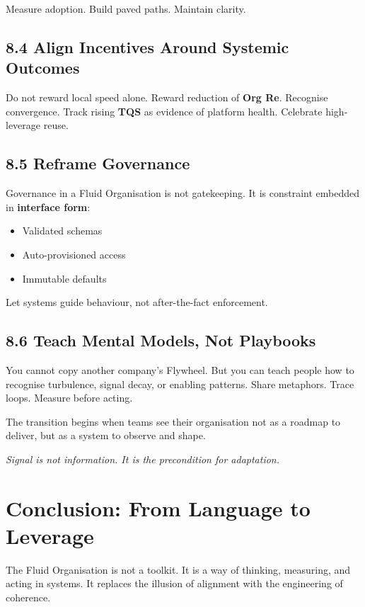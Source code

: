 \documentclass[12pt]{article}
\newenvironment{pullquote}
  {\begin{quoting}[leftmargin=2em,rightmargin=2em]\itshape}
  {\end{quoting}}
\begin{document}
Measure adoption. Build paved paths. Maintain clarity.

\subsection*{8.4 Align Incentives Around Systemic Outcomes}

Do not reward local speed alone. Reward reduction of \textbf{Org Re}. Recognise convergence. Track rising \textbf{TQS} as evidence of platform health. Celebrate high-leverage reuse.

\subsection*{8.5 Reframe Governance}

Governance in a Fluid Organisation is not gatekeeping. It is constraint embedded in \textbf{interface form}:
\begin{itemize}
    \item Validated schemas
    \item Auto-provisioned access
    \item Immutable defaults
\end{itemize}

Let systems guide behaviour, not after-the-fact enforcement.

\subsection*{8.6 Teach Mental Models, Not Playbooks}

You cannot copy another company’s Flywheel. But you can teach people how to recognise turbulence, signal decay, or enabling patterns. Share metaphors. Trace loops. Measure before acting.

The transition begins when teams see their organisation not as a roadmap to deliver, but as a system to observe and shape.

\begin{pullquote}
Signal is not information. It is the precondition for adaptation.
\end{pullquote}

\section{Conclusion: From Language to Leverage}

The Fluid Organisation is not a toolkit. It is a way of thinking, measuring, and acting in systems. It replaces the illusion of alignment with the engineering of coherence.
\end{document}
